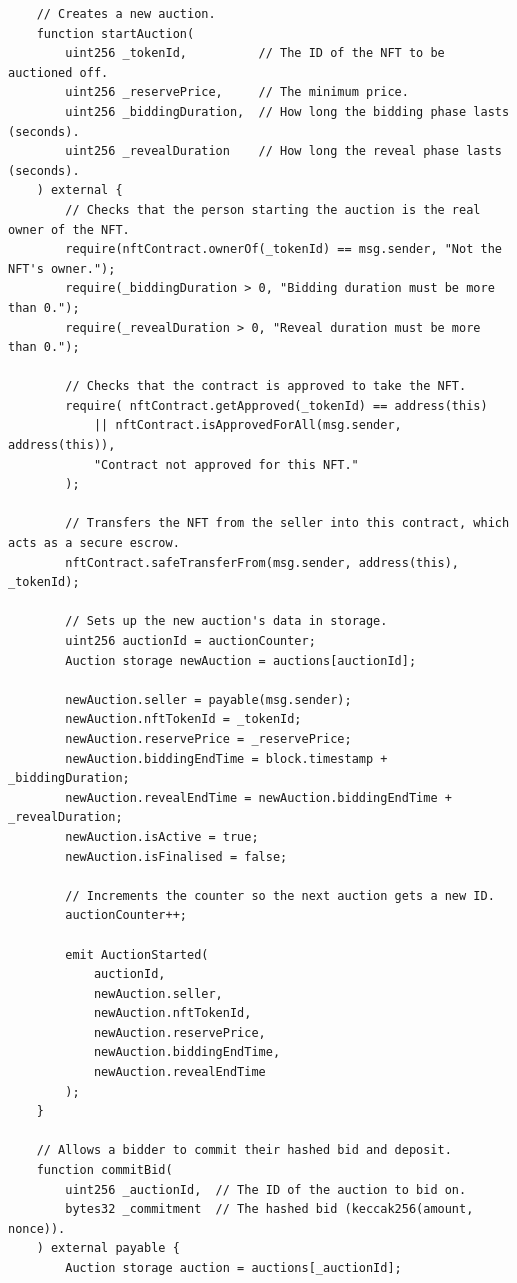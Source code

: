 \documentclass[11pt, a4paper]{article}
\begin{document}
\begin{lstlisting}
    // Creates a new auction.
    function startAuction(
        uint256 _tokenId,          // The ID of the NFT to be auctioned off.
        uint256 _reservePrice,     // The minimum price.
        uint256 _biddingDuration,  // How long the bidding phase lasts (seconds).
        uint256 _revealDuration    // How long the reveal phase lasts (seconds).
    ) external {
        // Checks that the person starting the auction is the real owner of the NFT.
        require(nftContract.ownerOf(_tokenId) == msg.sender, "Not the NFT's owner.");
        require(_biddingDuration > 0, "Bidding duration must be more than 0.");
        require(_revealDuration > 0, "Reveal duration must be more than 0.");

        // Checks that the contract is approved to take the NFT.
        require( nftContract.getApproved(_tokenId) == address(this) 
            || nftContract.isApprovedForAll(msg.sender, address(this)),
            "Contract not approved for this NFT."
        );

        // Transfers the NFT from the seller into this contract, which acts as a secure escrow.
        nftContract.safeTransferFrom(msg.sender, address(this), _tokenId);

        // Sets up the new auction's data in storage.
        uint256 auctionId = auctionCounter;
        Auction storage newAuction = auctions[auctionId];

        newAuction.seller = payable(msg.sender);
        newAuction.nftTokenId = _tokenId;
        newAuction.reservePrice = _reservePrice;
        newAuction.biddingEndTime = block.timestamp + _biddingDuration;
        newAuction.revealEndTime = newAuction.biddingEndTime + _revealDuration;
        newAuction.isActive = true;
        newAuction.isFinalised = false;

        // Increments the counter so the next auction gets a new ID.
        auctionCounter++;

        emit AuctionStarted(
            auctionId, 
            newAuction.seller, 
            newAuction.nftTokenId, 
            newAuction.reservePrice, 
            newAuction.biddingEndTime, 
            newAuction.revealEndTime
        );
    }

    // Allows a bidder to commit their hashed bid and deposit.
    function commitBid(
        uint256 _auctionId,  // The ID of the auction to bid on.
        bytes32 _commitment  // The hashed bid (keccak256(amount, nonce)).
    ) external payable {
        Auction storage auction = auctions[_auctionId];


\end{lstlisting}
\end{document}
